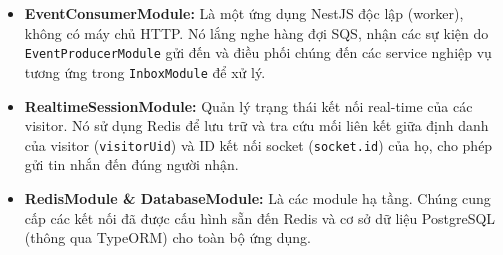 \begin{itemize}
    \item \textbf{EventConsumerModule:} Là một ứng dụng NestJS độc lập (worker), không có máy chủ HTTP. Nó lắng nghe hàng đợi SQS, nhận các sự kiện do \texttt{EventProducerModule} gửi đến và điều phối chúng đến các service nghiệp vụ tương ứng trong \texttt{InboxModule} để xử lý.

    \item \textbf{RealtimeSessionModule:} Quản lý trạng thái kết nối real-time của các visitor. Nó sử dụng Redis để lưu trữ và tra cứu mối liên kết giữa định danh của visitor (\texttt{visitorUid}) và ID kết nối socket (\texttt{socket.id}) của họ, cho phép gửi tin nhắn đến đúng người nhận.

    \item \textbf{RedisModule \& DatabaseModule:} Là các module hạ tầng. Chúng cung cấp các kết nối đã được cấu hình sẵn đến Redis và cơ sở dữ liệu PostgreSQL (thông qua TypeORM) cho toàn bộ ứng dụng.
\end{itemize}